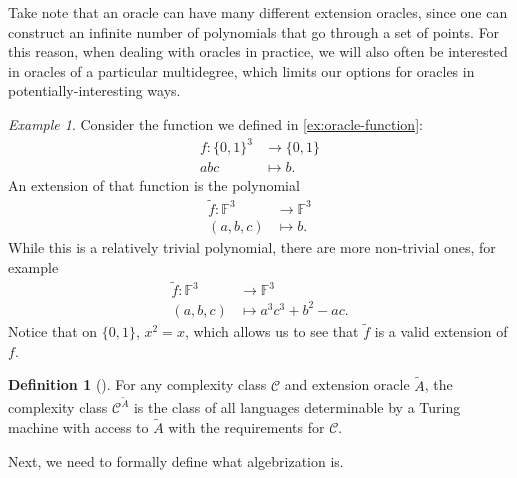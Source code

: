 \documentclass[english]{reedthesis}
\theoremstyle{plain}
\theoremstyle{definition}
\newtheorem{defn}[defn]{Definition}
\theoremstyle{remark}
\newtheorem{example}{Example}[thm]
\begin{document}
Take note that an oracle can have many different extension oracles, since one
can construct an infinite number of polynomials that go through a set of points.
For this reason, when dealing with oracles in practice, we will also often be
interested in oracles of a particular multidegree, which limits our options for
oracles in potentially-interesting ways.

\begin{example}\label{ex:oracle-function-ext}
  Consider the function we defined in \cref{ex:oracle-function}:
  \begin{equation}
    \begin{aligned}
      f: \{0, 1\}^{3} &\rightarrow \{0, 1\} \\
      abc &\mapsto b.
    \end{aligned}
  \end{equation}
  An extension of that function is the polynomial
  \begin{equation}
    \begin{aligned}
      \tilde{f}: \mathbb{F}^{3} &\rightarrow \mathbb{F}^{3} \\
      (a,b,c) &\mapsto b.
    \end{aligned}
  \end{equation}
  While this is a relatively trivial polynomial, there are more non-trivial
  ones, for example
  \begin{equation}
    \begin{aligned}
      \tilde{f}: \mathbb{F}^{3} &\rightarrow \mathbb{F}^{3} \\
      (a,b,c) &\mapsto a^{3}c^{3} + b^{2} - ac.
    \end{aligned}
  \end{equation}
  Notice that on $\{0, 1\}$, $x^{2} = x$, which allows us to see that
  $\tilde{f}$ is a valid extension of $f$.
\end{example}


\begin{defn}[{\cite[Def.\ 2.2]{AW09}}]\label{def:ext-oracle-class}
  For any complexity class $\mathcal{C}$ and extension oracle $\tilde{A}$, the complexity
  class $\mathcal{C}^{\tilde{A}}$ is the class of all languages determinable by a Turing
  machine with access to $\tilde{A}$ with the requirements for $\mathcal{C}$.
\end{defn}

Next, we need to formally define what algebrization is.
\end{document}
